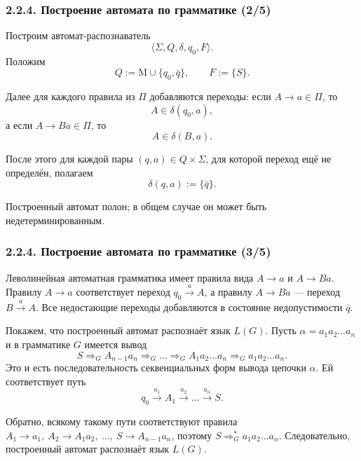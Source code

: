\documentclass[mathserif,12pt,aspectratio=169]{beamer}
\def\Assign{\operatorname{:=}}
\begin{document}
\begin{frame}
\frametitle{2.2.4. Построение автомата по грамматике (2/5)}

Построим автомат-распознаватель
\[
\langle \Sigma,Q,\delta,q_0,F\rangle.
\]
Положим
\[
Q\Assign \mathrm{M}\cup\{q_0,\bar q\},
\qquad
F\Assign\{S\}.
\]

\smallskip
Далее для каждого правила из \(\Pi\) добавляются переходы:
если \(A\to a\in\Pi\), то
\[
A\in\delta(q_0,a),
\]
а если \(A\to Ba\in\Pi\), то
\[
A\in\delta(B,a).
\]

\smallskip
После этого для каждой пары \((q,a)\in Q\times\Sigma\),
для которой переход ещё не определён, полагаем
\[
\delta(q,a)\Assign\{\bar q\}.
\]

\smallskip
Построенный автомат полон; в общем случае он может быть
недетерминированным.

\end{frame}

\begin{frame}
\frametitle{2.2.4. Построение автомата по грамматике (3/5)}

\begin{ground}
Леволинейная автоматная грамматика имеет правила вида
\(A\to a\) и \(A\to Ba\).
Правилу \(A\to a\) соответствует переход \(q_0\xrightarrow{a}A\),
а правилу \(A\to Ba\) --- переход \(B\xrightarrow{a}A\).
Все недостающие переходы добавляются в состояние недопустимости \(\bar q\).

Покажем, что построенный автомат распознаёт язык \(L(G)\).
Пусть \(\alpha=a_1a_2\dots a_n\) и в грамматике \(G\) имеется вывод
\[
S \Rightarrow_G A_{n-1}a_n \Rightarrow_G \dots
\Rightarrow_G A_1a_2\dots a_n \Rightarrow_G a_1a_2\dots a_n.
\]
Это и есть последовательность секвенциальных форм вывода цепочки \(\alpha\).
Ей соответствует путь
\[
q_0\xrightarrow{a_1}A_1\xrightarrow{a_2}\dots\xrightarrow{a_n}S.
\]

Обратно, всякому такому пути соответствуют правила
\(A_1\to a_1,\ A_2\to A_1a_2,\ \dots,\ S\to A_{n-1}a_n\),
поэтому \(S\Rightarrow_G^* a_1a_2\dots a_n\).
Следовательно, построенный автомат распознаёт язык \(L(G)\).
\end{ground}

\end{frame}
\end{document}
